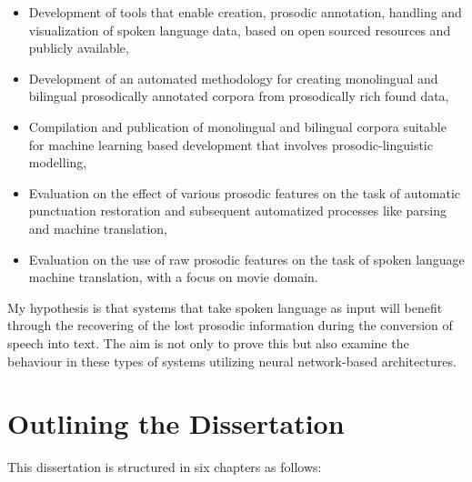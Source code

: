 \begin{itemize}
    \item Development of tools that enable creation, prosodic annotation, handling and visualization of spoken language data, based on open sourced resources and publicly available,
    \item Development of an automated methodology for creating monolingual and bilingual prosodically annotated corpora from prosodically rich found data,
    \item Compilation and publication of monolingual and bilingual corpora suitable for machine learning based development that involves prosodic-linguistic modelling,
    \item Evaluation on the effect of various prosodic features on the task of automatic punctuation restoration and subsequent automatized processes like parsing and machine translation,
    \item Evaluation on the use of raw prosodic features on the task of spoken language machine translation, with a focus on movie domain.
\end{itemize}

My hypothesis is that systems that take spoken language as input will benefit through the recovering of the lost prosodic information during the conversion of speech into text. The aim is not only to prove this but also examine the behaviour in these types of systems utilizing neural network-based architectures. 

\section{Outlining the Dissertation}

This dissertation is structured in six chapters as follows:


